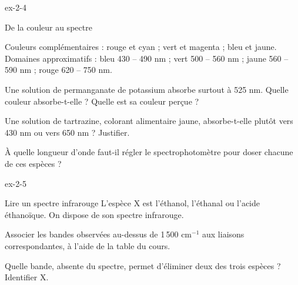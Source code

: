 \begin{blocLivre}{ex-2-4}
\begin{exercice}[1]{De la couleur au spectre}
\begin{donnees}
Couleurs complémentaires : rouge et cyan ; vert et magenta ; bleu et jaune.
Domaines approximatifs : bleu 430 -- 490 nm ; vert 500 -- 560 nm ; jaune 560 -- 590 nm ; rouge 620 -- 750 nm.
\end{donnees}
\begin{questions}
\item Une solution de permanganate de potassium absorbe surtout à 525 nm. Quelle couleur absorbe-t-elle ?
Quelle est sa couleur perçue ?
\item Une solution de tartrazine, colorant alimentaire jaune, absorbe-t-elle plutôt vers 430 nm ou vers 650 nm ? Justifier.
\item À quelle longueur d'onde faut-il régler le spectrophotomètre pour doser chacune de ces espèces ?
\end{questions}
\end{exercice}
\end{blocLivre}
\begin{blocLivre}{ex-2-5}
\begin{exercice}[1]{Lire un spectre infrarouge}
L'espèce X est l'éthanol, l'éthanal ou l'acide éthanoïque. On dispose de son spectre infrarouge.
\begin{questions}
\item Associer les bandes observées au-dessus de 1\,500 cm$^{-1}$ aux liaisons correspondantes, à l'aide de la table du cours.
\item Quelle bande, absente du spectre, permet d'éliminer deux des trois espèces ? Identifier X.
\end{questions}
\end{exercice}
\end{blocLivre}
